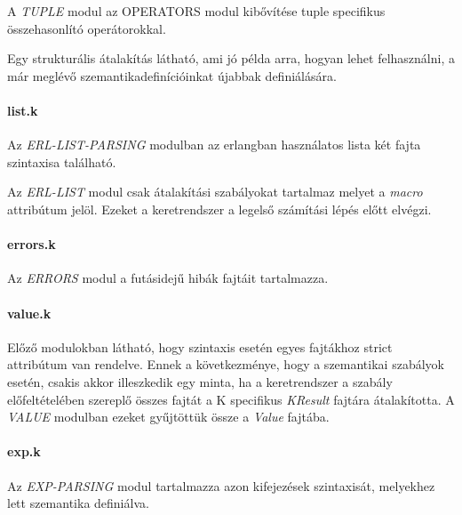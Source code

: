 

A \textit{TUPLE} modul az OPERATORS modul kibővítése tuple specifikus összehasonlító operátorokkal.



Egy strukturális átalakítás látható, ami jó példa arra, hogyan lehet felhasználni, a már meglévő szemantikadefinícióinkat újabbak definiálására.

\paragraph{list.k}

Az \textit{ERL-LIST-PARSING} modulban az erlangban használatos lista két fajta szintaxisa található.



Az \textit{ERL-LIST} modul csak átalakítási szabályokat tartalmaz melyet a \textit{macro} attribútum jelöl. Ezeket a keretrendszer a legelső számítási lépés előtt elvégzi.



\paragraph{errors.k}

Az \textit{ERRORS} modul a futásidejű hibák fajtáit tartalmazza.



\paragraph{value.k}

Előző modulokban látható, hogy szintaxis esetén egyes fajtákhoz strict attribútum van rendelve. Ennek a következménye, hogy a szemantikai szabályok esetén, csakis akkor illeszkedik egy minta, ha a keretrendszer a szabály előfeltételében szereplő összes fajtát a K specifikus \textit{KResult} fajtára átalakította. A \textit{VALUE} modulban ezeket gyűjtöttük össze a \textit{Value} fajtába.



\paragraph{exp.k}

Az \textit{EXP-PARSING} modul tartalmazza azon kifejezések szintaxisát, melyekhez lett szemantika definiálva.

